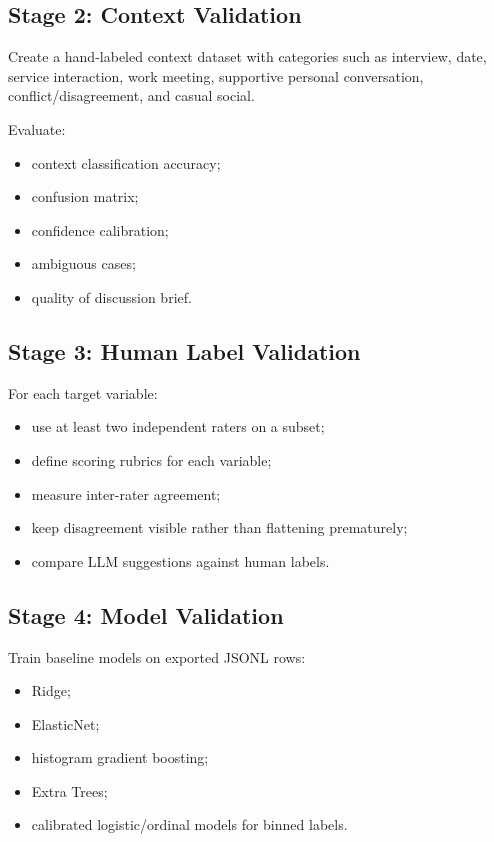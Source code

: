 \documentclass[11pt]{article}
\begin{document}
\subsection{Stage 2: Context Validation}

Create a hand-labeled context dataset with categories such as interview, date, service interaction, work meeting, supportive personal conversation, conflict/disagreement, and casual social.

Evaluate:

\begin{itemize}[leftmargin=*]
  \item context classification accuracy;
  \item confusion matrix;
  \item confidence calibration;
  \item ambiguous cases;
  \item quality of discussion brief.
\end{itemize}

\subsection{Stage 3: Human Label Validation}

For each target variable:

\begin{itemize}[leftmargin=*]
  \item use at least two independent raters on a subset;
  \item define scoring rubrics for each variable;
  \item measure inter-rater agreement;
  \item keep disagreement visible rather than flattening prematurely;
  \item compare LLM suggestions against human labels.
\end{itemize}

\subsection{Stage 4: Model Validation}

Train baseline models on exported JSONL rows:

\begin{itemize}[leftmargin=*]
  \item Ridge;
  \item ElasticNet;
  \item histogram gradient boosting;
  \item Extra Trees;
  \item calibrated logistic/ordinal models for binned labels.
\end{itemize}
\end{document}
